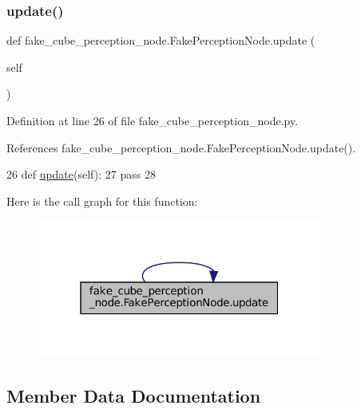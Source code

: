 \subsubsection{\texorpdfstring{update()}{update()}\hspace{0.1cm}{\footnotesize\ttfamily [3/3]}}
{\footnotesize\ttfamily def fake\+\_\+cube\+\_\+perception\+\_\+node.\+Fake\+Perception\+Node.\+update (\begin{DoxyParamCaption}\item[{}]{self }\end{DoxyParamCaption})}



Definition at line 26 of file fake\+\_\+cube\+\_\+perception\+\_\+node.\+py.



References fake\+\_\+cube\+\_\+perception\+\_\+node.\+Fake\+Perception\+Node.\+update().


\begin{DoxyCode}
26     \textcolor{keyword}{def }\hyperlink{classfake__cube__perception__node_1_1FakePerceptionNode_ae73741e7f84f057cbf109698e70a2515}{update}(self):
27         \textcolor{keywordflow}{pass}
28 
\end{DoxyCode}
Here is the call graph for this function\+:
\nopagebreak
\begin{figure}[H]
\begin{center}
\leavevmode
\includegraphics[width=265pt]{classfake__cube__perception__node_1_1FakePerceptionNode_ae73741e7f84f057cbf109698e70a2515_cgraph}
\end{center}
\end{figure}


\subsection{Member Data Documentation}
\mbox{\label{classfake__cube__perception__node_1_1FakePerceptionNode_a5af28c647aa93cf6bb90d4228e27667f}} 
